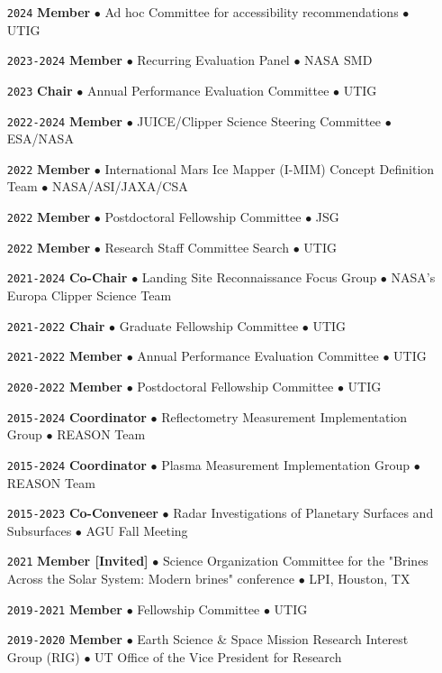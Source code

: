 \begin{itemize}[leftmargin=5.8em, labelsep=1.5em]
    \item[\texttt{2024}] \textbf{Member} $\bullet$ Ad hoc Committee for accessibility recommendations $\bullet$ UTIG
    \item[\texttt{2023-2024}] \textbf{Member} $\bullet$ Recurring Evaluation Panel $\bullet$ NASA SMD
    \item[\texttt{2023}] \textbf{Chair} $\bullet$ Annual Performance Evaluation Committee $\bullet$ UTIG
    \item[\texttt{2022-2024}] \textbf{Member} $\bullet$ JUICE/Clipper Science Steering Committee $\bullet$ ESA/NASA
    \item[\texttt{2022}] \textbf{Member} $\bullet$ International Mars Ice Mapper (I-MIM) Concept Definition Team $\bullet$ NASA/ASI/JAXA/CSA
    \item[\texttt{2022}] \textbf{Member} $\bullet$ Postdoctoral Fellowship Committee $\bullet$ JSG
    \item[\texttt{2022}] \textbf{Member} $\bullet$ Research Staff Committee Search $\bullet$ UTIG
    \item[\texttt{2021-2024}] \textbf{Co-Chair} $\bullet$ Landing Site Reconnaissance Focus Group  $\bullet$ NASA's Europa Clipper Science Team
    \item[\texttt{2021-2022}] \textbf{Chair} $\bullet$ Graduate Fellowship Committee $\bullet$ UTIG
    \item[\texttt{2021-2022}] \textbf{Member} $\bullet$ Annual Performance Evaluation Committee $\bullet$ UTIG
    \item[\texttt{2020-2022}] \textbf{Member} $\bullet$ Postdoctoral Fellowship Committee $\bullet$ UTIG
    \item[\texttt{2015-2024}] \textbf{Coordinator} $\bullet$ Reflectometry Measurement Implementation Group $\bullet$ REASON Team
    \item[\texttt{2015-2024}] \textbf{Coordinator} $\bullet$ Plasma Measurement Implementation Group $\bullet$ REASON Team
    \item[\texttt{2015-2023}] \textbf{Co-Conveneer} $\bullet$  Radar Investigations of Planetary Surfaces and Subsurfaces $\bullet$ AGU Fall Meeting
    \item[\texttt{2021}] \textbf{Member [Invited]} $\bullet$ Science Organization Committee for the "Brines Across the Solar System: Modern brines" conference $\bullet$ LPI, Houston, TX
    \item[\texttt{2019-2021}] \textbf{Member} $\bullet$ Fellowship Committee $\bullet$ UTIG
    \item[\texttt{2019-2020}] \textbf{Member} $\bullet$ Earth Science \& Space Mission Research Interest Group (RIG) $\bullet$ UT Office of the Vice President for Research

\end{itemize}

